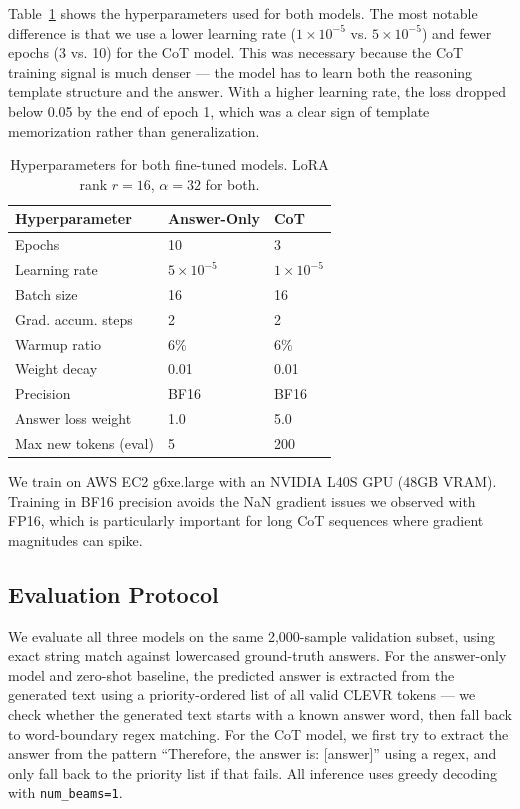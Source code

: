 \documentclass[11pt,twocolumn]{article}
\begin{document}
Table~\ref{tab:hyper} shows the hyperparameters used for both models. The most notable difference is that we use a lower learning rate ($1 \times 10^{-5}$ vs. $5 \times 10^{-5}$) and fewer epochs (3 vs. 10) for the CoT model. This was necessary because the CoT training signal is much denser — the model has to learn both the reasoning template structure and the answer. With a higher learning rate, the loss dropped below 0.05 by the end of epoch 1, which was a clear sign of template memorization rather than generalization.

\begin{table}[h]
\centering
\small
\begin{tabular}{lll}
\toprule
\textbf{Hyperparameter} & \textbf{Answer-Only} & \textbf{CoT} \\
\midrule
Epochs              & 10               & 3 \\
Learning rate       & $5\times10^{-5}$ & $1\times10^{-5}$ \\
Batch size          & 16               & 16 \\
Grad. accum. steps  & 2                & 2 \\
Warmup ratio        & 6\%              & 6\% \\
Weight decay        & 0.01             & 0.01 \\
Precision           & BF16             & BF16 \\
Answer loss weight  & 1.0              & 5.0 \\
Max new tokens (eval) & 5              & 200 \\
\bottomrule
\end{tabular}
\caption{Hyperparameters for both fine-tuned models. LoRA rank $r=16$, $\alpha=32$ for both.}
\label{tab:hyper}
\end{table}

We train on AWS EC2 g6xe.large with an NVIDIA L40S GPU (48GB VRAM). Training in BF16 precision avoids the NaN gradient issues we observed with FP16, which is particularly important for long CoT sequences where gradient magnitudes can spike.

\subsection{Evaluation Protocol}

We evaluate all three models on the same 2,000-sample validation subset, using exact string match against lowercased ground-truth answers. For the answer-only model and zero-shot baseline, the predicted answer is extracted from the generated text using a priority-ordered list of all valid CLEVR tokens — we check whether the generated text starts with a known answer word, then fall back to word-boundary regex matching. For the CoT model, we first try to extract the answer from the pattern ``Therefore, the answer is: [answer]'' using a regex, and only fall back to the priority list if that fails. All inference uses greedy decoding with \texttt{num\_beams=1}.
\end{document}
